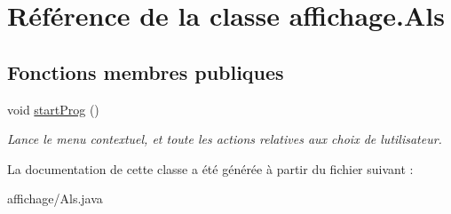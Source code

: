 \hypertarget{classaffichage_1_1_als}{}\section{Référence de la classe affichage.\+Als}
\label{classaffichage_1_1_als}
\subsection*{Fonctions membres publiques}
\begin{DoxyCompactItemize}
\item 
void \hyperlink{classaffichage_1_1_als_a31c2063eab5cb1b14270f2abfc86b998}{start\+Prog} ()\hypertarget{classaffichage_1_1_als_a31c2063eab5cb1b14270f2abfc86b998}{}\label{classaffichage_1_1_als_a31c2063eab5cb1b14270f2abfc86b998}

\begin{DoxyCompactList}\small\item\em Lance le menu contextuel, et toute les actions relatives aux choix de l\textquotesingle{}utilisateur. \end{DoxyCompactList}\end{DoxyCompactItemize}


La documentation de cette classe a été générée à partir du fichier suivant \+:\begin{DoxyCompactItemize}
\item 
affichage/Als.\+java\end{DoxyCompactItemize}
